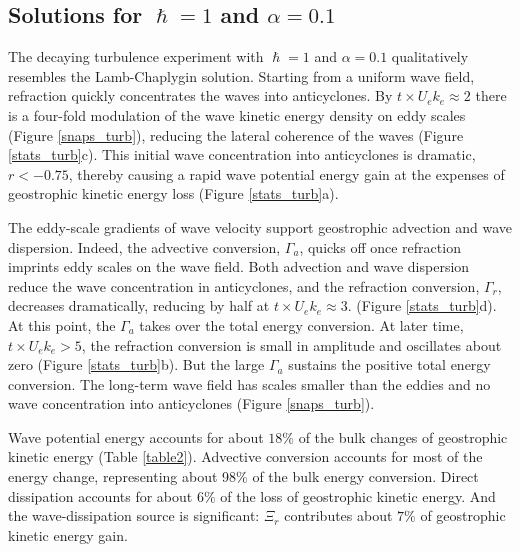 \documentclass{jfm}
\begin{document}
\subsection{Solutions for $\hslash = 1$ and $\alpha = 0.1$}

The decaying turbulence experiment with $\hslash = 1$ and $\alpha = 0.1$
qualitatively resembles the Lamb-Chaplygin solution.
Starting from a uniform wave field, refraction quickly concentrates the waves into
anticyclones. By
$t\times U_e k_e \approx 2$ there is a four-fold modulation of the wave kinetic
energy density on eddy scales (Figure \ref{snaps_turb}), reducing the lateral
coherence of the waves (Figure \ref{stats_turb}c). This initial wave concentration
into anticyclones is dramatic, $r < -0.75$, thereby causing a rapid wave potential
energy gain at the expenses of geostrophic kinetic energy loss
(Figure \ref{stats_turb}a).

The eddy-scale gradients of wave velocity support geostrophic advection and
wave dispersion. Indeed, the advective conversion, $\Gamma_a$, quicks off once
refraction imprints eddy scales on the wave field. Both advection and wave dispersion
reduce the wave concentration in anticyclones, and the refraction conversion,
$\Gamma_r$, decreases dramatically, reducing by half  at $t\times U_e k_e \approx 3$.
(Figure \ref{stats_turb}d). At this point, the $\Gamma_a$ takes over the total energy conversion.
At later time, $t\times U_e k_e > 5$, the refraction conversion is small
in amplitude and oscillates about zero (Figure \ref{stats_turb}b).
But the large $\Gamma_a$ sustains the positive total energy conversion. The long-term
wave field has scales smaller than the eddies and no wave concentration into anticyclones
(Figure \ref{snaps_turb}).

Wave potential energy accounts for about $18\%$ of the bulk changes of geostrophic
kinetic energy (Table \ref{table2}). Advective conversion accounts for most of the
energy change, representing about 98$\%$ of the bulk energy conversion. Direct
dissipation accounts for about $6\%$ of the loss of geostrophic kinetic energy.
And the wave-dissipation source is significant: $\Xi_r$ contributes about $7\%$
of geostrophic kinetic energy gain.
\end{document}
